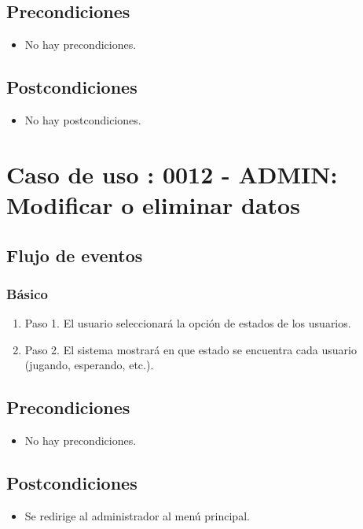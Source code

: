 \subsection{Precondiciones}
\begin{itemize}
\item No hay precondiciones.
\end{itemize}

\subsection{Postcondiciones}
\begin{itemize}
\item No hay postcondiciones.
\end{itemize}



\section{Caso de uso : 0012 - ADMIN: Modificar o eliminar datos}\label{sec:uc0}
\subsection{Flujo de eventos}
\subsubsection{Básico}

\begin{enumerate}
\item Paso 1.
El usuario seleccionará la opción de estados de los usuarios.
\item Paso 2.
El sistema mostrará en que estado se encuentra cada usuario (jugando, esperando, etc.).
\end{enumerate}

\subsection{Precondiciones}
\begin{itemize}
\item No hay precondiciones.
\end{itemize}

\subsection{Postcondiciones}
\begin{itemize}
\item Se redirige al administrador al menú principal.
\end{itemize}



